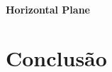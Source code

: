 \documentclass[
	12pt,				%
	openright,			%
	oneside,			%
	a4paper,		%
	chapter=TITLE,		%
	section=TITLE,		%
    brazil,				%
	english,			%
	sumario=tradicional,
	]{abntex2}
\begin{document}
      \subsubsection{Horizontal Plane}



\chapter*[Conclusão]{Conclusão}
\lipsum[1-5]


\postextual

% 

\end{document}

